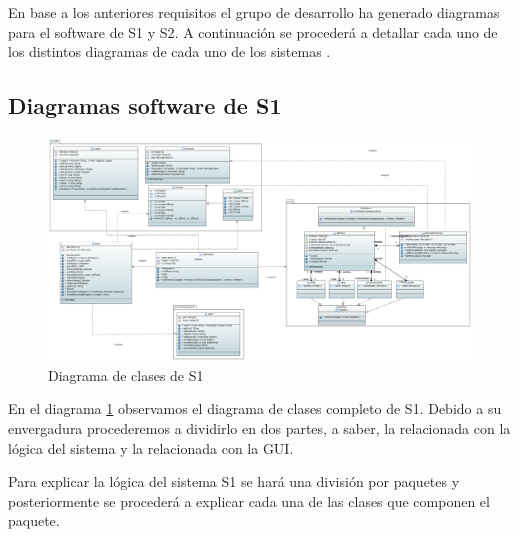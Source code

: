 
En base a los anteriores requisitos el grupo de desarrollo ha generado diagramas para el software de \ac{S1} y \ac{S2}. A continuación se procederá a detallar cada uno de los distintos diagramas de cada uno de los sistemas . 

\subsection{Diagramas software de S1}

\begin{figure}[H]
    \centering
    \includegraphics[width=\linewidth]{pictures/S1ClassDiagram.PNG}
    \caption{Diagrama de clases de \ac{S1}}
    \label{fig:diagrama_clases_s1}
\end{figure}

En el diagrama \ref{fig:diagrama_clases_s1} observamos el diagrama de clases completo de \ac{S1}. Debido a su envergadura procederemos a dividirlo en dos partes, a saber, la relacionada con la lógica del sistema y la relacionada con la GUI.

Para explicar la lógica del sistema \ac{S1} se hará una división por paquetes y posteriormente se procederá a explicar cada una de las clases que componen el paquete.


